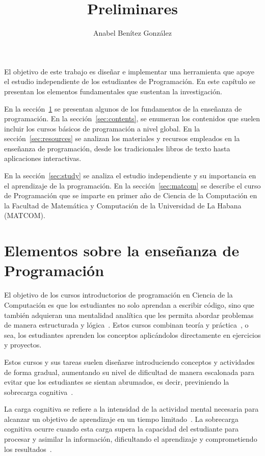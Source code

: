 \documentclass{article}
\title{Preliminares}
\author{Anabel Benítez González}
\date{}
\begin{document}

\maketitle

El objetivo de este trabajo es diseñar e implementar una herramienta que apoye el estudio independiente de los estudiantes de Programación. En este capítulo se presentan los elementos fundamentales que sustentan la investigación.

En la sección~\ref{sec:ensenanza_programacion} se presentan algunos de los fundamentos de la enseñanza de programación. En la sección~\ref{sec:contents}, se enumeran los contenidos que suelen incluir los cursos básicos de programación a nivel global. En la sección~\ref{sec:resources} se analizan los materiales y recursos empleados en la enseñanza de programación, desde los tradicionales libros de texto hasta aplicaciones interactivas.

En la sección~\ref{sec:study} se analiza el estudio independiente y su importancia en el aprendizaje de la programación. En la sección~\ref{sec:matcom} se describe el curso de Programación que se imparte en primer año de Ciencia de la Computación en la Facultad de Matemática y Computación de la Universidad de La Habana (\mbox{MATCOM}).

\section{Elementos sobre la enseñanza de Programación}\label{sec:ensenanza_programacion}

El objetivo de los cursos introductorios de programación en Ciencia de la Computación es que los estudiantes no solo aprendan a escribir código, sino que también adquieran una mentalidad analítica que les permita abordar problemas de manera estructurada y lógica~\cite{JOHNLEMAY2021100056}. Estos cursos combinan teoría y práctica~\cite{Sarsa_2022}, o sea, los estudiantes aprenden los conceptos aplicándolos directamente en ejercicios y proyectos.

Estos cursos y sus tareas suelen diseñarse introduciendo conceptos y actividades de forma gradual, aumentando su nivel de dificultad de manera escalonada para evitar que los estudiantes se sientan abrumados, es decir, previniendo la sobrecarga cognitiva~\cite{duran2021clt}.

La carga cognitiva se refiere a la intensidad de la actividad mental necesaria para alcanzar un objetivo de aprendizaje en un tiempo limitado~\cite{duran2021clt}. La sobrecarga cognitiva ocurre cuando esta carga supera la capacidad del estudiante para procesar y asimilar la información, dificultando el aprendizaje y comprometiendo los resultados~\cite{duran2021clt}. 
\end{document}

